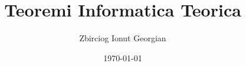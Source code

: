 \documentclass{article}
\title{Teoremi Informatica Teorica}
\author{Zbirciog Ionut Georgian}
\date{\today}
\begin{document}
\maketitle

\begin{flushleft}

\tableofcontents
\newpage







\end{flushleft}
\end{document}
